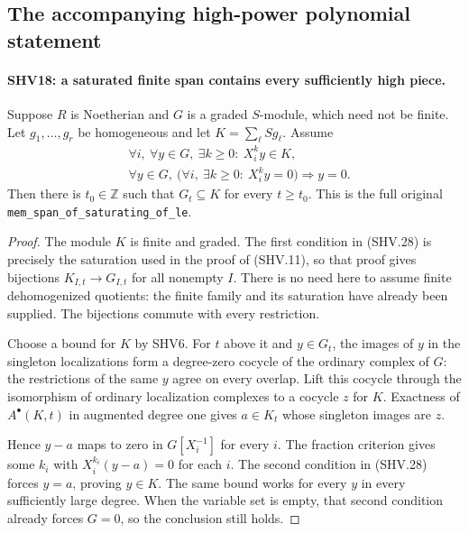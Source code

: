 \documentclass[11pt,a4paper]{article}
\numberwithin{equation}{section}
\theoremstyle{remark}\newtheorem{remark}[theorem]{Remark}
\begin{document}
\subsection{The accompanying high-power polynomial statement}

\paragraph{SHV18: a saturated finite span contains every sufficiently high piece.}
\label{claim:SHV18}
Suppose $R$ is Noetherian and $G$ is a graded $S$-module,
which need not be finite.  Let $g_1,\ldots,g_r$ be homogeneous
and let $K=\sum_\ell Sg_\ell$.  Assume
\[
 \begin{split}
 &\forall i,\ \forall y\in G,\ \exists k\ge0:\ X_i^k y\in K,\\
 &\forall y\in G,\ 
       \bigl(\forall i,\ \exists k\ge0:\ X_i^k y=0\bigr)
           \Longrightarrow y=0.
 \end{split}                                           \tag{SHV.28}
\]
Then there is $t_0\in\mathbb Z$ such that $G_t\subseteq K$
for every $t\ge t_0$.  This is the full original
\texttt{mem\_\allowbreak span\_\allowbreak of\_\allowbreak saturating\_\allowbreak of\_\allowbreak le}.

\begin{proof}
The module $K$ is finite and graded.  The first condition in
(SHV.28) is precisely the saturation used in the proof of
(SHV.11), so that proof gives bijections
$K_{I,t}\to G_{I,t}$ for all nonempty $I$.
There is no need here to assume finite dehomogenized quotients:
the finite family and its saturation have already been supplied.
The bijections commute with every restriction.

Choose a bound for $K$ by SHV6.  For $t$ above it and
$y\in G_t$, the images of $y$ in the singleton localizations
form a degree-zero cocycle of the ordinary complex of $G$:
the restrictions of the same $y$ agree on every overlap.
Lift this cocycle through the isomorphism of ordinary
localization complexes to a cocycle $z$ for $K$.
Exactness of $A^\bullet(K,t)$ in augmented degree one gives
$a\in K_t$ whose singleton images are $z$.

Hence $y-a$ maps to zero in $G[X_i^{-1}]$ for every $i$.
The fraction criterion gives some $k_i$ with
$X_i^{k_i}(y-a)=0$ for each $i$.  The second condition
in (SHV.28) forces $y=a$, proving $y\in K$.
The same bound works for every $y$ in every sufficiently
large degree.  When the variable set is empty, that second
condition already forces $G=0$, so the conclusion still holds.
\end{proof}
\end{document}
